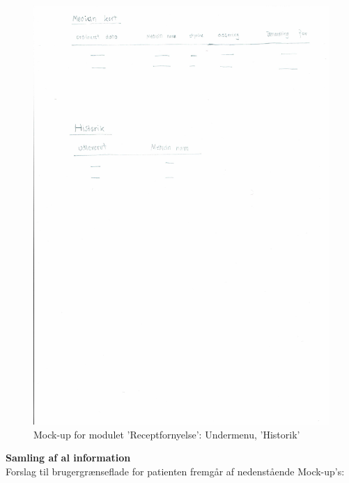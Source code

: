 \begin{figure}[H]
	\centering
	\includegraphics[angle=0, width=\linewidth]{Materials/FornyRecept_Historik.pdf}
	\caption{Mock-up for modulet 'Receptfornyelse': Undermenu, 'Historik'}
	\label{fig:Mock-Up4}
\end{figure}
\textbf{Samling af al information} \\
Forslag til brugergrænseflade for patienten fremgår af nedenstående Mock-up's:\\
